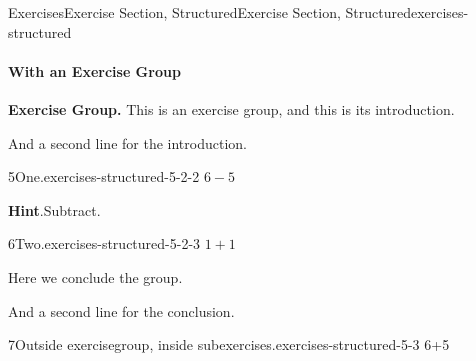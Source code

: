 \documentclass[oneside,10pt,]{article}
\newcommand{\blocktitlefont}{\relax}
\numberwithin{equation}{section}
\begin{document}
\begin{exercises-section}{Exercises}{Exercise Section, Structured}{}{Exercise Section, Structured}{}{}{exercises-structured}
\paragraph{With an Exercise Group}\hypertarget{exercises-structured-5}{}
\par\medskip\noindent%
\textbf{Exercise Group.}\space\space%
This is an exercise group, and this is its introduction.%
\par
And a second line for the introduction.%
\begin{exercisegroup}
\begin{divisionexerciseeg}{5}{One.}{}{exercises-structured-5-2-2}%
\(6-5\)%
\par\smallskip%
\noindent\textbf{\blocktitlefont Hint}.\hypertarget{exercises-structured-5-2-2-3}{}\quad{}Subtract.%
\end{divisionexerciseeg}%
\begin{divisionexerciseeg}{6}{Two.}{}{exercises-structured-5-2-3}%
\(1+1\)%
\end{divisionexerciseeg}%
\end{exercisegroup}
\par\noindent%
Here we conclude the group.%
\par
And a second line for the conclusion.%
\par\medskip\noindent
\begin{divisionexercise}{7}{Outside exercisegroup, inside subexercises.}{}{exercises-structured-5-3}%
6+5%
\end{divisionexercise}%
\end{exercises-section}
\end{document}
